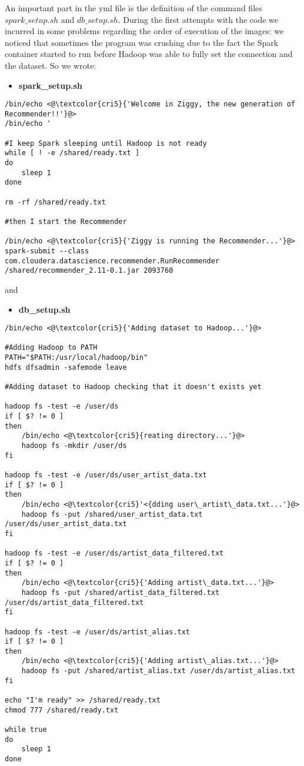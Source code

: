 \documentclass[11pt,a4paper,titlepage]{article}
\begin{document}
An important part in the yml file is the definition of the command files $spark\_setup.sh$ and $db\_setup.sh$. During the first attempts with the code we incurred in some problems regarding the order of execution of the images: we noticed that sometimes the program was crushing due to the fact the Spark container started to run before Hadoop was able to fully set the connection and the dataset. So we wrote:
\begin{itemize}
\item \textbf{spark\_setup.sh}
\end{itemize}
\begin{lstlisting}[style=myBashstyle]
/bin/echo <@\textcolor{cri5}{'Welcome in Ziggy, the new generation of Recommender!!'}@>
/bin/echo '

#I keep Spark sleeping until Hadoop is not ready
while [ ! -e /shared/ready.txt ]
do
    sleep 1
done

rm -rf /shared/ready.txt

#then I start the Recommender

/bin/echo <@\textcolor{cri5}{'Ziggy is running the Recommender...'}@>
spark-submit --class com.cloudera.datascience.recommender.RunRecommender /shared/recommender_2.11-0.1.jar 2093760
\end{lstlisting}
and
\begin{itemize}
\item \textbf{db\_setup.sh}
\end{itemize}
\begin{lstlisting}[style=myBashstyle]
/bin/echo <@\textcolor{cri5}{'Adding dataset to Hadoop...'}@>

#Adding Hadoop to PATH
PATH="$PATH:/usr/local/hadoop/bin"
hdfs dfsadmin -safemode leave

#Adding dataset to Hadoop checking that it doesn't exists yet

hadoop fs -test -e /user/ds
if [ $? != 0 ]
then
    /bin/echo <@\textcolor{cri5}{reating directory...'}@>
    hadoop fs -mkdir /user/ds
fi

hadoop fs -test -e /user/ds/user_artist_data.txt
if [ $? != 0 ]
then
    /bin/echo <@\textcolor{cri5}'<{dding user\_artist\_data.txt...'}@>
    hadoop fs -put /shared/user_artist_data.txt /user/ds/user_artist_data.txt
fi

hadoop fs -test -e /user/ds/artist_data_filtered.txt
if [ $? != 0 ]
then
    /bin/echo <@\textcolor{cri5}{'Adding artist\_data.txt...'}@>
    hadoop fs -put /shared/artist_data_filtered.txt /user/ds/artist_data_filtered.txt
fi

hadoop fs -test -e /user/ds/artist_alias.txt
if [ $? != 0 ]
then
    /bin/echo <@\textcolor{cri5}{'Adding artist\_alias.txt...'}@>
    hadoop fs -put /shared/artist_alias.txt /user/ds/artist_alias.txt
fi

echo "I'm ready" >> /shared/ready.txt
chmod 777 /shared/ready.txt

while true
do
    sleep 1
done
\end{lstlisting}
\end{document}
